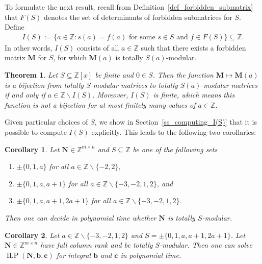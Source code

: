\documentclass[a4paper, 11pt]{article}
\DeclareMathOperator{\ILP}{ILP}
\newcommand{\Z}{\mathbb{Z}}
\newcommand{\bc}{\bm{c}}
\newcommand{\bb}{\bm{b}}
\newcommand{\bM}{\bm{M}}
\newcommand{\bN}{\bm{N}}
\newcommand{\indet}{x}
\newcommand{\intvar}{a}
\newcommand{\polyring}{\Z[\indet]}
\newcommand{\polyS}{S}
\newcommand{\polyM}{\bM}
\newtheorem{theorem}{Theorem}
\newtheorem{corollary}{Corollary}
\begin{document}
		To formulate the next result, recall from Definition~\ref{def_forbidden_submatrix} that $F(\polyS)$ denotes the set of determinants of forbidden submatrices for $\polyS$. Define
	\begin{align*}
		I(\polyS) := \lbrace \intvar\in\Z : s(\intvar) = f(\intvar)\text{ for some }s\in \polyS \text{ and }f\in F(\polyS)\rbrace\subseteq\Z.
	\end{align*}
	In other words, $I(\polyS)$ consists of all $\intvar\in\Z$ such that there exists a forbidden matrix $\bM$ for $\polyS$, for which $\bM(\intvar)$ is totally $\polyS(\intvar)$-modular.
	\begin{theorem}
		\label{thm_from_integer_to_polyring}
		Let $S\subseteq \polyring$ be finite and $0\in S$. Then the function $\polyM\mapsto\polyM(\intvar)$ is a bijection from totally $\polyS$-modular matrices to totally $\polyS(\intvar)$-modular matrices if and only if $\intvar \in \Z\backslash I(\polyS)$. Moreover, $I(\polyS)$ is finite, which means this function is not a bijection for at most finitely many values of $\intvar\in\Z$.
	\end{theorem}
	Given particular choices of $\polyS$, we show in  Section~\ref{ss_computing_I(S)} that it is possible to compute $I(\polyS)$ explicitly. This leads to the following two corollaries:
	\begin{corollary}
		\label{cor_recognition_int}
		Let $\bN\in\Z^{m\times n}$ and $\polyS \subseteq \Z$ be one of the following sets
		\begin{enumerate}
			\item $\pm \lbrace 0,1,\intvar\rbrace$ for all $\intvar\in\Z\backslash\lbrace -2,2\rbrace$,
			\item $\pm \lbrace 0,1,\intvar,\intvar + 1\rbrace$ for all $\intvar \in \Z \backslash\lbrace -3,-2,1,2\rbrace$, and
			\item $\pm \lbrace 0,1,\intvar,\intvar + 1,2\intvar + 1\rbrace$ for all $\intvar \in \Z\backslash\lbrace -3,-2,1,2\rbrace$.
		\end{enumerate}
		Then one can decide in polynomial time whether $\bN$ is totally $\polyS$-modular.
	\end{corollary}
	
	\begin{corollary}
		\label{cor_opt_int}
		Let $\intvar\in\Z\backslash\lbrace -3,-2,1,2\rbrace$ and $S = \pm\lbrace 0,1,\intvar,\intvar + 1,2\intvar + 1\rbrace$. Let $\bN\in\Z^{m\times n}$ have full column rank and be totally $S$-modular. Then one can solve $\ILP(\bN,\bb,\bc)$ for integral $\bb$ and $\bc$ in polynomial time.
	\end{corollary}
	
\end{document}

